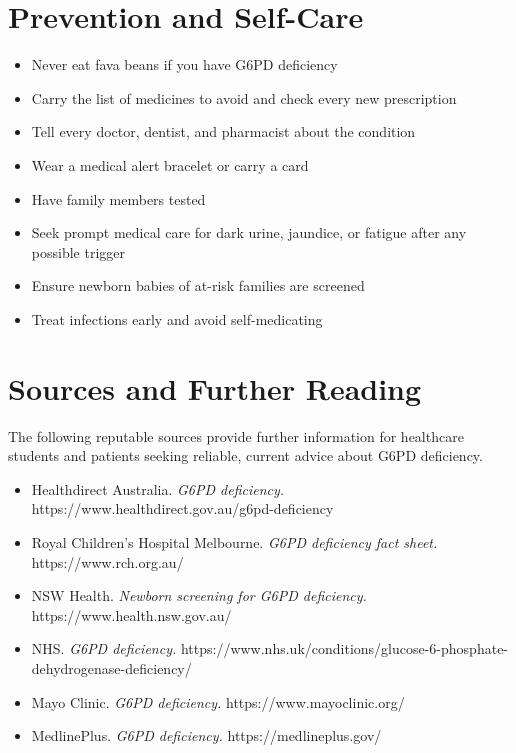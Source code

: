 \section*{Prevention and Self-Care}
\begin{itemize}
    \item Never eat fava beans if you have G6PD deficiency
    \item Carry the list of medicines to avoid and check every new prescription
    \item Tell every doctor, dentist, and pharmacist about the condition
    \item Wear a medical alert bracelet or carry a card
    \item Have family members tested
    \item Seek prompt medical care for dark urine, jaundice, or fatigue after any possible trigger
    \item Ensure newborn babies of at-risk families are screened
    \item Treat infections early and avoid self-medicating
\end{itemize}

\section*{Sources and Further Reading}
The following reputable sources provide further information for healthcare students and patients seeking reliable, current advice about G6PD deficiency.
\begin{itemize}
    \item Healthdirect Australia. \textit{G6PD deficiency.} https://www.healthdirect.gov.au/g6pd-deficiency
    \item Royal Children's Hospital Melbourne. \textit{G6PD deficiency fact sheet.} https://www.rch.org.au/
    \item NSW Health. \textit{Newborn screening for G6PD deficiency.} https://www.health.nsw.gov.au/
    \item NHS. \textit{G6PD deficiency.} https://www.nhs.uk/conditions/glucose-6-phosphate-dehydrogenase-deficiency/
    \item Mayo Clinic. \textit{G6PD deficiency.} https://www.mayoclinic.org/
    \item MedlinePlus. \textit{G6PD deficiency.} https://medlineplus.gov/
\end{itemize}
